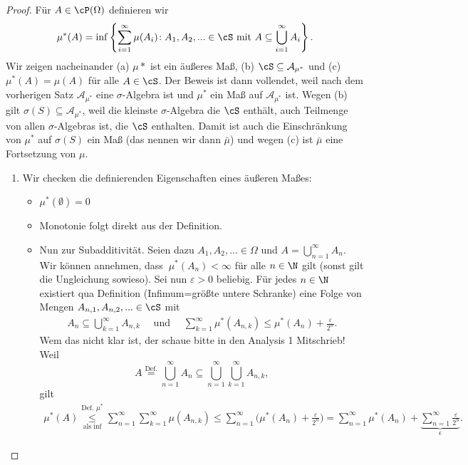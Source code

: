 \begin{proof}
	Für $A \in \cP(\Omega)$ definieren wir \[ \mu^{*}(A) = \inf\left\{ \sum\limits_{i=1}^{\infty} \mu(A_i) \! : A_1,A_2,... \in \cS \text{ mit } A \subseteq \bigcup\limits_{i = 1}^{\infty} A_i \right\}. \]
	Wir zeigen nacheinander (a) $\mu*$ ist ein \"au\ss eres Ma\ss{}, (b) $\cS \subseteq \mathcal A_{\mu^*}$ und (c) $\mu^*(A)=\mu(A)$ f\"ur alle $A\in \cS$. Der Beweis ist dann vollendet, weil nach dem vorherigen Satz $\mathcal A_{\mu^*}$ eine $\sigma$-Algebra ist und $\mu^*$ ein Ma\ss{} auf $\mathcal A_{\mu^*}$ ist. Wegen (b) gilt $\sigma(S)\subseteq \mathcal A_{\mu^*}$, weil die kleinste $\sigma$-Algebra die $\cS$ enth\"alt, auch Teilmenge von allen $\sigma$-Algebras ist, die $\cS$ enthalten. Damit ist auch die Einschr\"ankung von $\mu^*$ auf $\sigma(S)$ ein Ma\ss{} (das nennen wir dann $\bar \mu$) und wegen (c) ist $\bar\mu$ eine Fortsetzung von $\mu$.
\begin{enumerate}[label=(\alph*)]
\item	
	Wir checken die definierenden Eigenschaften eines \"au\ss eren Ma\ss es:
	\begin{itemize}
		\item $\mu^{*}(\emptyset) = 0$
		\item Monotonie folgt direkt aus der Definition.
		\item Nun zur Subadditivität. Seien dazu $A_1,A_2,... \in \Omega $ und $A = \bigcup\limits_{n = 1}^{\infty} A_n.$ Wir k\"onnen annehmen, dass $ \: \mu^{*}(A_n) < \infty$ f\"ur alle $n\in\N$ gilt (sonst gilt die Ungleichung sowieso). Sei nun $\varepsilon > 0$ beliebig. Für jedes $n \in \N$ existiert qua Definition (Infimum=gr\"o\ss te untere Schranke) eine Folge von Mengen $A_{n,1},A_{n,2},... \in \cS$ mit
		\begin{align*}
			A_n \subseteq \bigcup\limits_{k=1}^{\infty} A_{n,k} \quad \text{ und }\quad \sum\limits_{k=1}^{\infty} \mu^{*}(A_{n,k}) \leq \mu^{*}(A_n) + \frac{\varepsilon}{2^n}.			\end{align*}
		Wem das nicht klar ist, der schaue bitte in den Analysis 1 Mitschrieb! Weil \[A \overset{\text{Def.}}{=} \bigcup\limits_{n = 1}^{\infty} A_n \subseteq \bigcup\limits_{n = 1}^{\infty} \bigcup\limits_{k=1}^{\infty} A_{n,k}, \] gilt
		\begin{gather*}
			\mu^{*}(A) \underset{\text{als } \inf}{\overset{\text{Def. } \mu^{*}}{\leq}} \sum\limits_{n = 1}^{\infty} \sum\limits_{k = 1}^{\infty} \mu(A_{n,k}) \leq \sum\limits_{n = 1}^{\infty} \Big( \mu^{*}(A_n) + \frac{\varepsilon}{2^n} \Big) = \sum\limits_{n = 1}^{\infty} \mu^{*}(A_n) + \underbrace{\sum_{n=1}^\infty \frac{\varepsilon}{2^n}}_{\epsilon}.

\end{gather*}
\end{itemize}
\end{enumerate}
\end{proof}
